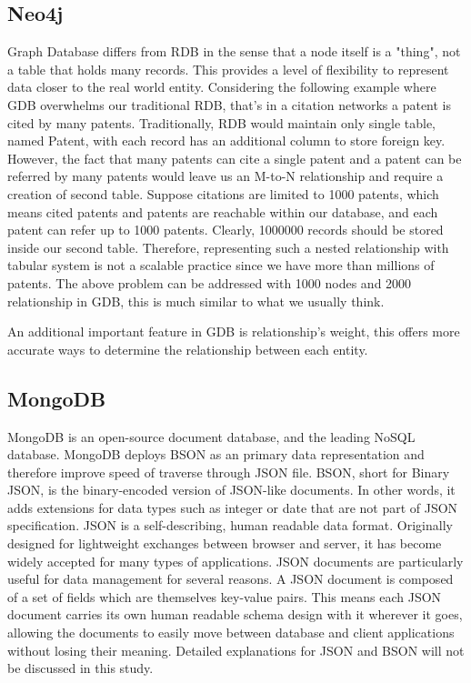 \documentclass{article}
\begin{document}
\subsection{Neo4j}
Graph Database differs from RDB in the sense that a node itself is a "thing", not a table that holds many records. This provides a level of flexibility to represent data closer to the real world entity. Considering the following example where GDB overwhelms our traditional RDB, that's in a citation networks a patent is cited by many patents. Traditionally, RDB would maintain only single table, named Patent, with each record has an additional column to store foreign key. However, the fact that many patents can cite a single patent and a patent can be referred by many patents would leave us an M-to-N relationship and require a creation of second table. Suppose citations are limited to 1000 patents, which means cited patents and patents are reachable within our database, and each patent can refer up to 1000 patents. Clearly, 1000000 records should be stored inside our second table. Therefore, representing such a nested relationship with tabular system is not a scalable practice since we have more than millions of patents. The above problem can be addressed with 1000 nodes and 2000 relationship in GDB, this is much similar to what we usually think.

An additional important feature in GDB is relationship's weight, this offers more accurate ways to determine the relationship between each entity. 

\subsection{MongoDB}
MongoDB  is an open-source document database, and the leading NoSQL database. MongoDB deploys BSON as an primary data representation and therefore improve speed of traverse through JSON file. BSON, short for Binary JSON, is the binary-encoded version of JSON-like documents. In other words, it adds extensions for data types such as integer or date that are not part of JSON specification. JSON is a self-describing, human readable data format. Originally designed for lightweight exchanges between browser and server, it has become widely accepted for many types of applications. JSON documents are particularly useful for data management for several reasons. A JSON document is composed of a set of fields which are themselves key-value pairs. This means each JSON document carries its own human readable schema design with it wherever it goes, allowing the documents to easily move between database and client applications without losing their meaning. Detailed explanations for JSON and BSON will not be discussed in this study.
\end{document}
